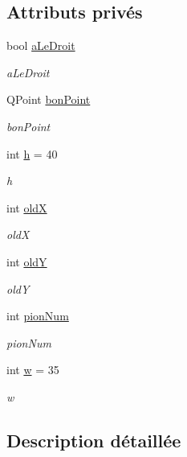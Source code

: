 \subsection*{Attributs privés}
\begin{DoxyCompactItemize}
\item 
bool \hyperlink{classpion_a99fe9f6343fa8261506fb5140ffd7dfa}{a\-Le\-Droit}
\begin{DoxyCompactList}\small\item\em a\-Le\-Droit \end{DoxyCompactList}\item 
Q\-Point \hyperlink{classpion_a7642cd4d43560d2fd90c33aa566d2526}{bon\-Point}
\begin{DoxyCompactList}\small\item\em bon\-Point \end{DoxyCompactList}\item 
int \hyperlink{classpion_a432598bfa12510f56629bb8e4e44a6d1}{h} = 40
\begin{DoxyCompactList}\small\item\em h \end{DoxyCompactList}\item 
int \hyperlink{classpion_ac953cdf61df0ff4b445b278e3be2bffc}{old\-X}
\begin{DoxyCompactList}\small\item\em old\-X \end{DoxyCompactList}\item 
int \hyperlink{classpion_a842a7ce1b21307287e434dd9d598eaee}{old\-Y}
\begin{DoxyCompactList}\small\item\em old\-Y \end{DoxyCompactList}\item 
int \hyperlink{classpion_a7338c5dde99c3d415665776d76c2d2db}{pion\-Num}
\begin{DoxyCompactList}\small\item\em pion\-Num \end{DoxyCompactList}\item 
int \hyperlink{classpion_ada2a7530bcff33b54aeb9b082a8d7bdb}{w} = 35
\begin{DoxyCompactList}\small\item\em w \end{DoxyCompactList}\end{DoxyCompactItemize}


\subsection{Description détaillée}


